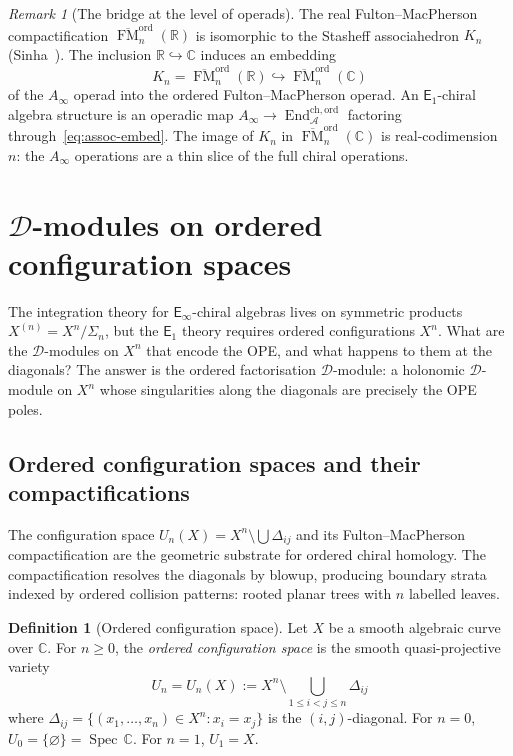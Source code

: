 \documentclass[11pt,reqno]{amsart}
\theoremstyle{definition}
\newtheorem{definition}[theorem]{Definition}
\theoremstyle{remark}
\newtheorem{remark}[theorem]{Remark}
\newcommand{\cA}{\mathcal{A}}
\newcommand{\cD}{\mathcal{D}}
\newcommand{\Ainf}{A_{\infty}}
\newcommand{\Eone}{\mathsf{E}_{1}}
\newcommand{\Einf}{\mathsf{E}_{\infty}}
\DeclareMathOperator{\End}{End}
\DeclareMathOperator{\FM}{FM}
\DeclareMathOperator{\Spec}{Spec}
\newcommand{\CC}{\mathbb{C}}
\newcommand{\RR}{\mathbb{R}}
\numberwithin{equation}{section}
\begin{document}
\begin{remark}[The bridge at the level of operads]
\label{rem:bridge-operads}
The real Fulton--MacPherson compactification
$\overline{\FM}_n^{\mathrm{ord}}(\RR)$ is isomorphic
to the Stasheff associahedron $K_n$
(Sinha~\cite{Sinha04}).
The inclusion $\RR \hookrightarrow \CC$ induces an
embedding
\begin{equation}\label{eq:assoc-embed}
  K_n = \overline{\FM}_n^{\mathrm{ord}}(\RR)
  \hookrightarrow
  \overline{\FM}_n^{\mathrm{ord}}(\CC)
\end{equation}
of the $\Ainf$ operad into the ordered Fulton--MacPherson
operad. An $\Eone$-chiral algebra structure is an
operadic map
$\Ainf \to \End^{\mathrm{ch,ord}}_\cA$
factoring through~\eqref{eq:assoc-embed}.
The image of $K_n$ in $\overline{\FM}_n^{\mathrm{ord}}(\CC)$
is real-codimension~$n$: the $\Ainf$ operations are a
thin slice of the full chiral operations.
\end{remark}


\section{$\cD$-modules on ordered configuration spaces}
\label{sec:dmod-ordered}

The integration theory for $\Einf$-chiral algebras lives on
symmetric products $X^{(n)} = X^n/\Sigma_n$, but the
$\Eone$ theory requires ordered configurations $X^n$.
What are the $\cD$-modules on $X^n$ that encode the OPE,
and what happens to them at the diagonals? The answer
is the ordered factorisation $\cD$-module: a holonomic
$\cD$-module on $X^n$ whose singularities along the
diagonals are precisely the OPE poles.

\subsection{Ordered configuration spaces and their
compactifications}
\label{subsec:config}

The configuration space $U_n(X) = X^n \setminus
\bigcup \Delta_{ij}$ and its Fulton--MacPherson
compactification are the geometric substrate for
ordered chiral homology. The compactification resolves
the diagonals by blowup, producing boundary strata
indexed by ordered collision patterns: rooted planar trees
with $n$ labelled leaves.

\begin{definition}[Ordered configuration space]
\label{def:ord-conf}
Let $X$ be a smooth algebraic curve over $\CC$.
For $n \geq 0$, the \emph{ordered configuration space} is
the smooth quasi-projective variety
\begin{equation}\label{eq:ord-conf}
  U_n = U_n(X)
  := X^n \setminus \bigcup_{1 \leq i < j \leq n} \Delta_{ij}
\end{equation}
where $\Delta_{ij} = \{(x_1, \ldots, x_n) \in X^n :
x_i = x_j\}$ is the $(i,j)$-diagonal.
For $n = 0$, $U_0 = \{\varnothing\} = \Spec\,\CC$.
For $n = 1$, $U_1 = X$.
\end{definition}
\end{document}
